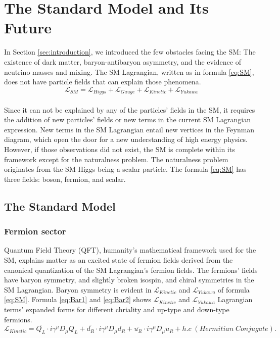 \chapter{The Standard Model and Its Future}\label{sec:theory}
In Section \ref{sec:introduction}, we introduced the few obstacles facing the SM: The existence of dark matter, baryon-antibaryon asymmetry, and the evidence of neutrino masses and mixing.
The SM Lagrangian, written as in formula \ref{eq:SM}, does not have particle fields that can explain those phenomena.
\begin{equation}
\label{eq:SM}
\mathcal{L}_{SM} = \mathcal{L}_{Higgs}+\mathcal{L}_{Gauge}+\mathcal{L}_{Kinetic}+\mathcal{L}_{Yukawa}
\end{equation}
\begin{align*}
\end{align*}

Since it can not be explained by any of the particles' fields in the SM, it requires the addition of new particles' fields or new terms in the current SM Lagrangian expression.
New terms in the SM Lagrangian entail new vertices in the Feynman diagram, which open the door for a new understanding of high energy physics.
However, if those observations did not exist, the SM is complete within its framework except for the naturalness problem.
The naturalness problem originates from the SM Higgs being a scalar particle.
The formula \ref{eq:SM} has three fields: boson, fermion, and scalar.
\section{The Standard Model}
\subsection{Fermion sector}

Quantum Field Theory (QFT), humanity's mathematical framework used for the SM, explains matter as an excited state of fermion fields derived from the canonical quantization of the SM Lagrangian's fermion fields.
The fermions' fields have baryon symmetry, and slightly broken isospin, and chiral symmetries in the SM Lagrangian.
Baryon symmetry is evident in $\mathcal{L}_{Kinetic}$ and $\mathcal{L}_{Yukawa}$ of formula \ref{eq:SM}. 
Formula \ref{eq:Bar1} and \ref{eq:Bar2} shows $\mathcal{L}_{Kinetic}$ and $\mathcal{L}_{Yukawa}$ Lagrangian terms' expanded forms for different chriality and up-type and down-type fermions.
\begin{equation}
\label{eq:Bar1}
	\mathcal{L}_{Kinetic}  = \bar{Q_{L}}\cdot i\gamma^{\mu}D_{\mu}Q_{L}+\bar{d_{R}}\cdot i\gamma^{\mu}D_{\mu}d_{R}+\bar{u_{R}}\cdot i\gamma^{\mu}D_{\mu}u_{R}+h.c\;(Hermitian\;Conjugate).
\end{equation}

